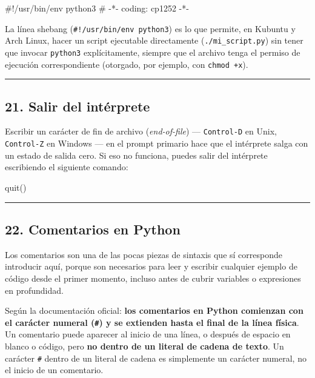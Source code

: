 \documentclass[
  doc,
  floatsintext,
  longtable,
  a4paper,
  nolmodern,
  notxfonts,
  notimes,
  12pt,
  colorlinks=true,linkcolor=blue,citecolor=blue,urlcolor=blue]{apa7}
\newenvironment{Shaded}{\begin{snugshade}}{\end{snugshade}}
\newcommand{\CommentTok}[1]{\textcolor[rgb]{0.37,0.37,0.37}{#1}}
\newcommand{\NormalTok}[1]{\textcolor[rgb]{0.00,0.23,0.31}{#1}}
\begin{document}
\begin{Shaded}
\begin{Highlighting}[]
\CommentTok{\#!/usr/bin/env python3}
\CommentTok{\# {-}*{-} coding: cp1252 {-}*{-}}
\end{Highlighting}
\end{Shaded}

La línea shebang (\texttt{\#!/usr/bin/env\ python3}) es lo que permite,
en Kubuntu y Arch Linux, hacer un script ejecutable directamente
(\texttt{./mi\_script.py}) sin tener que invocar \texttt{python3}
explícitamente, siempre que el archivo tenga el permiso de ejecución
correspondiente (otorgado, por ejemplo, con \texttt{chmod\ +x}).

\begin{center}\rule{0.5\linewidth}{0.5pt}\end{center}

\subsection{21. Salir del intérprete}\label{salir-del-intuxe9rprete}

Escribir un carácter de fin de archivo (\emph{end-of-file}) ---
\texttt{Control-D} en Unix, \texttt{Control-Z} en Windows --- en el
prompt primario hace que el intérprete salga con un estado de salida
cero. Si eso no funciona, puedes salir del intérprete escribiendo el
siguiente comando:

\begin{Shaded}
\begin{Highlighting}[]
\NormalTok{quit()}
\end{Highlighting}
\end{Shaded}

\begin{center}\rule{0.5\linewidth}{0.5pt}\end{center}

\subsection{22. Comentarios en Python}\label{comentarios-en-python}

Los comentarios son una de las pocas piezas de sintaxis que sí
corresponde introducir aquí, porque son necesarios para leer y escribir
cualquier ejemplo de código desde el primer momento, incluso antes de
cubrir variables o expresiones en profundidad.

Según la documentación oficial: \textbf{los comentarios en Python
comienzan con el carácter numeral (\texttt{\#}) y se extienden hasta el
final de la línea física}. Un comentario puede aparecer al inicio de una
línea, o después de espacio en blanco o código, pero \textbf{no dentro
de un literal de cadena de texto}. Un carácter \texttt{\#} dentro de un
literal de cadena es simplemente un carácter numeral, no el inicio de un
comentario.
\end{document}
